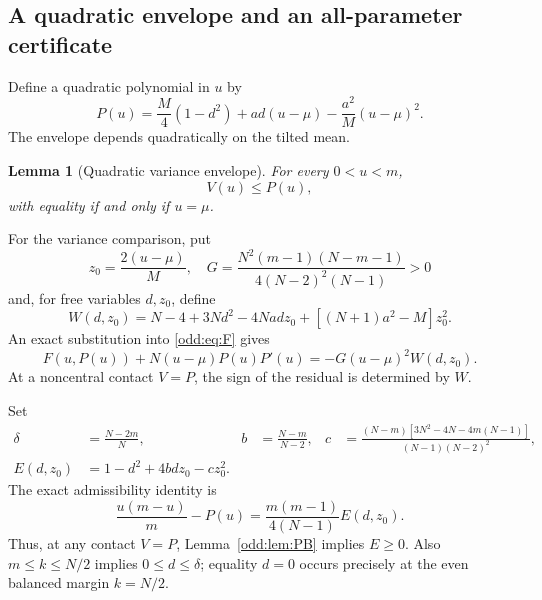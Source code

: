 \documentclass[11pt,a4paper]{article}
\newtheorem{lemma}[theorem]{Lemma}
\begin{document}
\subsection{A quadratic envelope and an all-parameter certificate}
Define a quadratic polynomial in $u$ by
\begin{equation}\label{odd:eq:P}
 P(u)=\frac M4(1-d^2)+ad(u-\mu)-\frac{a^2}{M}(u-\mu)^2.
\end{equation}
The envelope depends quadratically on the tilted mean.

\begin{lemma}[Quadratic variance envelope]\label{odd:lem:barrier}
For every $0<u<m$,
\begin{equation}\label{odd:eq:barrier}
 \boxed{\quad V(u)\le P(u),\quad}
\end{equation}
with equality if and only if $u=\mu$.
\end{lemma}

For the variance comparison, put
\[
 z_0=\frac{2(u-\mu)}M,\quad
 G=\frac{N^2(m-1)(N-m-1)}{4(N-2)^2(N-1)}>0
\]
and, for free variables $d,z_0$, define
\begin{equation}\label{odd:eq:W}
 W(d,z_0)=N-4+3Nd^2-4Nad z_0+[(N+1)a^2-M]z_0^2.
\end{equation}
An exact substitution into \eqref{odd:eq:F} gives
\begin{equation}\label{odd:eq:residual}
 \boxed{\quad F(u,P(u))+N(u-\mu)P(u)P'(u)
 =-G(u-\mu)^2W(d,z_0).\quad}
\end{equation}
At a noncentral contact $V=P$, the sign of the residual is determined by $W$.

Set
\begin{align*}
 \delta&=\frac{N-2m}{N},&
 b&=\frac{N-m}{N-2},&
 c&=\frac{(N-m)[3N^2-4N-4m(N-1)]}{(N-1)(N-2)^2},\\
 E(d,z_0)&=1-d^2+4bdz_0-cz_0^2.
\end{align*}
The exact admissibility identity is
\begin{equation}\label{odd:eq:E}
 \frac{u(m-u)}m-P(u)=\frac{m(m-1)}{4(N-1)}E(d,z_0).
\end{equation}
Thus, at any contact $V=P$, Lemma~\ref{odd:lem:PB} implies $E\ge0$.
Also $m\le k\le N/2$ implies $0\le d\le\delta$; equality $d=0$ occurs precisely at the even balanced margin $k=N/2$.
\end{document}
